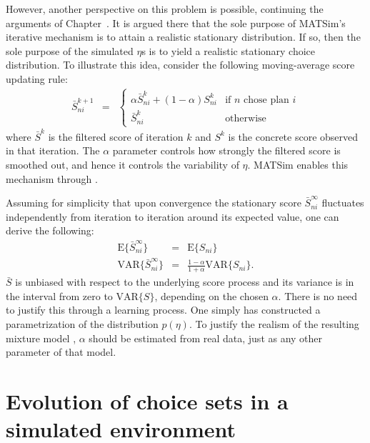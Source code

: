 However, another perspective on this problem is possible, continuing
the arguments of Chapter~. It is argued there that
the sole purpose of MATSim's iterative mechanism is to attain a realistic
stationary distribution. If so, then the sole purpose of the simulated
$\eta$s is to yield a realistic stationary choice distribution. To
illustrate this idea, consider the following moving-average score
updating rule:
\begin{eqnarray}
\bar{S}_{ni}^{k+1} & = & \begin{cases}
\alpha\bar{S}_{ni}^{k}+(1-\alpha)S_{ni}^{k} & \text{if }n\text{ chose plan }i\\
\bar{S}_{ni}^{k} & \text{otherwise}
\end{cases}
\end{eqnarray}
where $\bar{S}^{k}$ is the filtered score of iteration $k$ and $S^{k}$
is the concrete score observed in that iteration. The $\alpha$ parameter
controls how strongly the filtered score is smoothed out, and hence
it controls the variability of $\eta$. MATSim enables this mechanism
through . 

Assuming for simplicity that upon convergence the stationary score
$\bar{S}_{ni}^{\infty}$ fluctuates independently from iteration to
iteration around its expected value, one can derive the following:
\begin{eqnarray}
\text{E}\{\bar{S}_{ni}^{\infty}\} & = & \text{E}\{S_{ni}\}\\
\text{VAR}\{\bar{S}_{ni}^{\infty}\} & = & \frac{1-\alpha}{1+\alpha}\text{VAR}\{S_{ni}\}.
\end{eqnarray}
$\bar{S}$ is unbiased with respect to the underlying score process
and its variance is in the interval from zero to $\text{VAR}\{S\}$,
depending on the chosen $\alpha$. There is no need to justify this
through a learning process. One simply has constructed a parametrization
of the distribution $p(\eta)$. To justify the realism of the resulting
mixture model , $\alpha$ should be
estimated from real data, just as any other parameter of that model.


\section{\label{sec:Evolution-of-choice}Evolution of choice sets in a simulated
environment}


